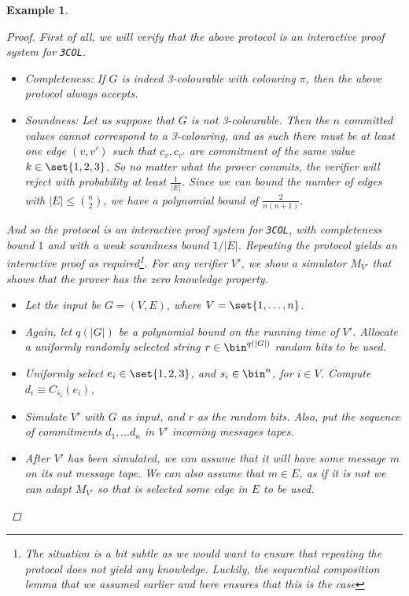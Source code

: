 \documentclass{article}
\newtheorem{example}{Example}
\begin{document}
\begin{example}
\begin{proof}
        First of all, we will verify that the above protocol is an interactive proof system for \texttt{3COL}.
        \begin{itemize}
            \item Completeness: If $G$ is indeed 3-colourable with colouring $\pi$, then the above protocol always accepts.
            \item Soundness: Let us suppose that $G$ is not 3-colourable. Then the $n$ committed values cannot
                  correspond to a 3-colouring, and as such there must be at least one edge $(v, v')$ such that
                  $c_v, c_{v'}$ are commitment of the same value $k \in \set{1, 2, 3}$. So no matter what the
                  prover commits, the verifier will reject with probability at least $\frac{1}{|E|}$. Since we can bound
                  the number of edges with $|E| \leq \binom{n}{2}$, we have a polynomial bound of $\frac{2}{n(n+1)}$.
        \end{itemize}
        And so the protocol is an interactive proof system for \texttt{3COL}, with completeness bound $1$ and
        with a weak soundness bound $1/|E|$. Repeating the protocol yields an interactive proof as required\footnote{The situation is a bit subtle as we would want to ensure that repeating the protocol does not yield any knowledge.
            Luckily, the sequential composition lemma that we assumed earlier and here ensures that this is the case}.
        For any verifier $V'$, we show a simulator $M_{V'}$ that shows that the prover has the zero knowledge property.
        \begin{itemize}
            \item Let the input be $G = (V, E)$, where $V = \set{1, \dots, n }$.
            \item Again, let $q(|G|)$ be a polynomial bound on the running time of $V'$. Allocate a uniformly randomly selected string $r \in \bin^{q(|G|)}$ random bits to be used.
            \item Uniformly select $e_i \in \set{1, 2, 3}$, and $s_i \in \bin^n$, for $i \in V$. Compute $d_i \equiv C_{s_i}(e_i)$,
            \item Simulate $V'$ with $G$ as input, and $r$ as the random bits. Also, put the sequence of commitments $d_1, \dots d_n$ in $V'$ incoming messages tapes.
            \item After $V'$ has been simulated, we can assume that it will have some message $m$ on its out message tape. We can also
                  assume that $m \in E$, as if it is not we can adapt $M_{V'}$ so that is selected some edge in $E$ to be used.

\end{itemize}
\end{proof}
\end{example}
\end{document}
